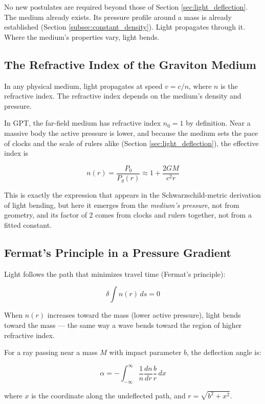 \documentclass[12pt, a4paper]{article}
\begin{document}
No new postulates are required beyond those of Section \ref{sec:light_deflection}. The medium already exists. Its pressure profile around a mass is already established (Section \ref{subsec:constant_density}). Light propagates through it. Where the medium's properties vary, light bends.

\subsection{The Refractive Index of the Graviton Medium}
\label{subsec:refractive_index_medium}

In any physical medium, light propagates at speed \( v = c/n \), where \( n \) is the refractive index. The refractive index depends on the medium's density and pressure.

In GPT, the far-field medium has refractive index \( n_0 = 1 \) by definition. Near a massive body the active pressure is lower, and because the medium sets the pace of clocks and the scale of rulers alike (Section \ref{sec:light_deflection}), the effective index is

\[
n(r) = \frac{P_0}{P_g(r)} \approx 1 + \frac{2GM}{c^2 r}
\]

This is exactly the expression that appears in the Schwarzschild-metric derivation of light bending, but here it emerges from the \textit{medium's pressure}, not from geometry, and its factor of 2 comes from clocks and rulers together, not from a fitted constant.

\subsection{Fermat's Principle in a Pressure Gradient}
\label{subsec:fermat_density}

Light follows the path that minimizes travel time (Fermat's principle):

\[
\delta \int n(r) \, ds = 0
\]

When \( n(r) \) increases toward the mass (lower active pressure), light bends toward the mass — the same way a wave bends toward the region of higher refractive index.

For a ray passing near a mass \( M \) with impact parameter \( b \), the deflection angle is:

\[
\alpha = -\int_{-\infty}^{\infty} \frac{1}{n} \frac{dn}{dr} \frac{b}{r} \, dx
\]

where \( x \) is the coordinate along the undeflected path, and \( r = \sqrt{b^2 + x^2} \).
\end{document}
